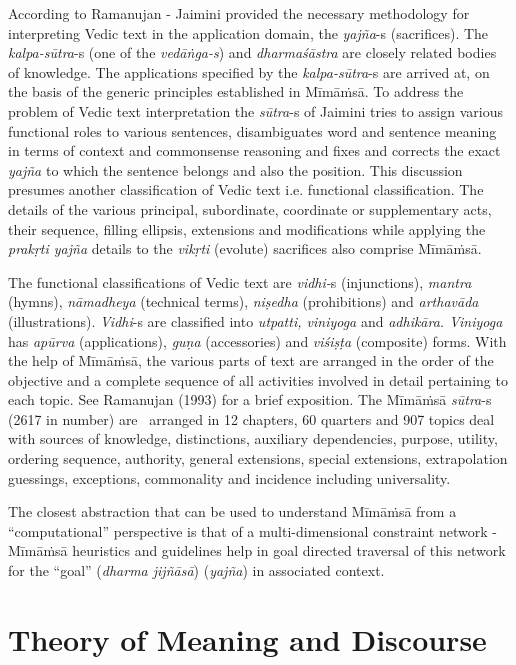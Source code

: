 According to Ramanujan - Jaimini provided the necessary methodology for interpreting Vedic text in the application domain, the \textit{yajña}-s (sacrifices). The \textit{kalpa-sūtra}-s (one of the \textit{vedāṅga-s}) and \textit{dharmaśāstra} are closely related bodies of knowledge. The applications specified by the \textit{kalpa-sūtra}-s are arrived at, on the basis of the generic principles established in Mīmāṁsā. To address the problem of Vedic text interpretation the \textit{sūtra}-s of Jaimini tries to assign various functional roles to various sentences, disambiguates word and sentence meaning in terms of context and commonsense reasoning and fixes and corrects the exact \textit{yajña} to which the sentence belongs and also the position. This discussion presumes another classification of Vedic text i.e. functional classification. The details of the various principal, subordinate, coordinate or supplementary acts, their sequence, filling ellipsis, extensions and modifications while applying the \textit{prakṛti yajña} details to the \textit{vikṛti} (evolute) sacrifices also comprise Mīmāṁsā.

The functional classifications of Vedic text are \textit{vidhi-}s (injunctions),\textit{ mantra} (hymns), \textit{nāmadheya} (technical terms), \textit{niṣedha} (prohibitions) and \textit{arthavāda} (illustrations). \textit{Vidhi}-s are classified into \textit{utpatti, viniyoga} and \textit{adhikāra. Viniyoga} has \textit{apūrva} (applications), \textit{guṇa} (accessories) and \textit{viśiṣṭa} (composite) forms. With the help of Mīmāṁsā, the various parts of text are arranged in the order of the objective and a complete sequence of all activities involved in detail pertaining to each topic. See Ramanujan (1993) for a brief exposition. The Mīmāṁsā \textit{sūtra}-s (2617 in number) are  arranged in 12 chapters, 60 quarters and 907 topics deal with sources of knowledge, distinctions, auxiliary dependencies, purpose, utility, ordering sequence, authority, general extensions, special extensions, extrapolation guessings, exceptions, commonality and incidence including universality.

The closest abstraction that can be used to understand Mīmāṁsā from a “computational” perspective is that of a multi-dimensional constraint network - Mīmāṁsā heuristics and guidelines help in goal directed traversal of this network for the “goal” (\textit{dharma jijñāsā}) (\textit{yajña}) in associated context.


\section*{Theory of Meaning and Discourse}

